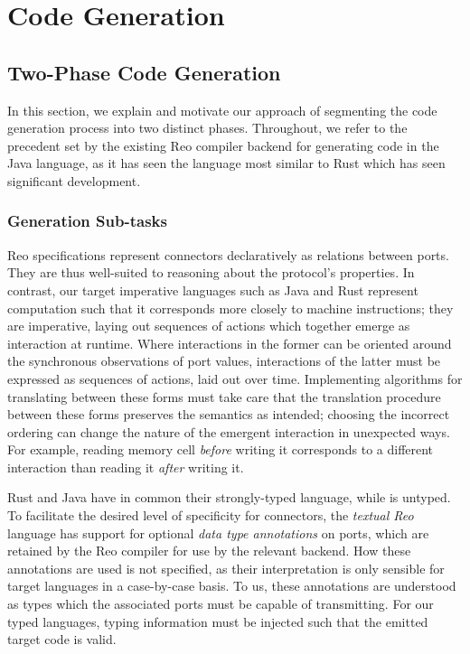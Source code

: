 \chapter{Code Generation}
\label{sec:imperative_form}







\section{Two-Phase Code Generation}
In this section, we explain and motivate our approach of segmenting the code generation process into two distinct phases. Throughout, we refer to the precedent set by the existing Reo compiler backend for generating code in the Java language, as it has seen the language most similar to Rust which has seen significant development.   

\subsection{Generation Sub-tasks}
Reo specifications represent connectors declaratively as relations between ports. They are thus well-suited to reasoning about the protocol's properties. In contrast, our target imperative languages such as Java and Rust represent computation such that it corresponds more closely to machine instructions; they are imperative, laying out sequences of actions which together emerge as interaction at runtime. Where interactions in the former can be oriented around the synchronous observations of port values, interactions of the latter must be expressed as sequences of actions, laid out over time. Implementing algorithms for translating between these forms must take care that the translation procedure between these forms preserves the semantics as intended; choosing the incorrect ordering can change the nature of the emergent interaction in unexpected ways. For example, reading memory cell \textit{before} writing it corresponds to a different interaction than reading it \textit{after} writing it. 

Rust and Java have in common their strongly-typed language, while  is untyped. To facilitate the desired level of specificity for connectors, the \textit{textual Reo} language has support for optional \textit{data type annotations} on ports, which are retained by the Reo compiler for use by the relevant backend. How these annotations are used is not specified, as their interpretation is only sensible for target languages in a case-by-case basis. To us, these annotations are understood as types which the associated ports must be capable of transmitting. For our typed languages, typing information must be injected such that the emitted target code is valid.

